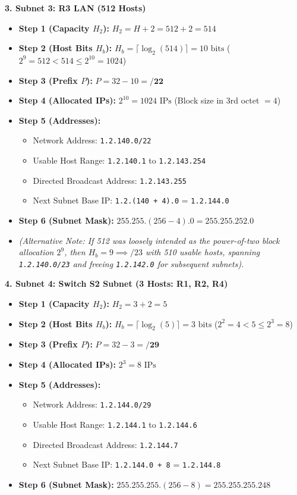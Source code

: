 \documentclass[11pt,a4paper]{article}
\begin{document}
\textbf{3. Subnet 3: R3 LAN (512 Hosts)}
\begin{itemize}
    \item \textbf{Step 1 (Capacity $H_2$):} $H_2 = H + 2 = 512 + 2 = 514$
    \item \textbf{Step 2 (Host Bits $H_b$):} $H_b = \lceil \log_2(514) \rceil = 10\text{ bits}$ ($2^9 = 512 < 514 \le 2^{10} = 1024$)
    \item \textbf{Step 3 (Prefix $P$):} $P = 32 - 10 = \mathbf{/22}$
    \item \textbf{Step 4 (Allocated IPs):} $2^{10} = 1024\text{ IPs}$ (Block size in 3rd octet $= 4$)
    \item \textbf{Step 5 (Addresses):}
    \begin{itemize}
        \item Network Address: \texttt{1.2.140.0/22}
        \item Usable Host Range: \texttt{1.2.140.1} to \texttt{1.2.143.254}
        \item Directed Broadcast Address: \texttt{1.2.143.255}
        \item Next Subnet Base IP: \texttt{1.2.(140 + 4).0} = \texttt{1.2.144.0}
    \end{itemize}
    \item \textbf{Step 6 (Subnet Mask):} $255.255.(256 - 4).0 = \mathbf{255.255.252.0}$
    \item \textit{(Alternative Note: If 512 was loosely intended as the power-of-two block allocation $2^9$, then $H_b = 9 \implies /23$ with 510 usable hosts, spanning \texttt{1.2.140.0/23} and freeing \texttt{1.2.142.0} for subsequent subnets)}.
\end{itemize}

\textbf{4. Subnet 4: Switch S2 Subnet (3 Hosts: R1, R2, R4)}
\begin{itemize}
    \item \textbf{Step 1 (Capacity $H_2$):} $H_2 = 3 + 2 = 5$
    \item \textbf{Step 2 (Host Bits $H_b$):} $H_b = \lceil \log_2(5) \rceil = 3\text{ bits}$ ($2^2 = 4 < 5 \le 2^3 = 8$)
    \item \textbf{Step 3 (Prefix $P$):} $P = 32 - 3 = \mathbf{/29}$
    \item \textbf{Step 4 (Allocated IPs):} $2^3 = 8\text{ IPs}$
    \item \textbf{Step 5 (Addresses):}
    \begin{itemize}
        \item Network Address: \texttt{1.2.144.0/29}
        \item Usable Host Range: \texttt{1.2.144.1} to \texttt{1.2.144.6}
        \item Directed Broadcast Address: \texttt{1.2.144.7}
        \item Next Subnet Base IP: \texttt{1.2.144.0 + 8} = \texttt{1.2.144.8}
    \end{itemize}
    \item \textbf{Step 6 (Subnet Mask):} $255.255.255.(256 - 8) = \mathbf{255.255.255.248}$
\end{itemize}
\end{document}
